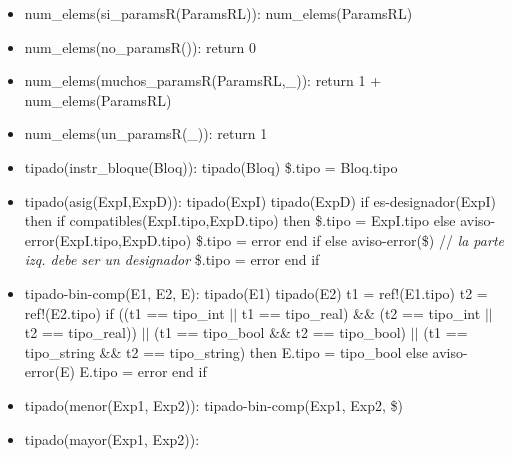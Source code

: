\documentclass[11pt]{article}
\begin{document}
\begin{itemize}
            \item num\_elems(si\_paramsR(ParamsRL)): 
                \subitem num\_elems(ParamsRL) 
            \item num\_elems(no\_paramsR()): 
                \subitem return 0
            \item num\_elems(muchos\_paramsR(ParamsRL,\_)): 
                \subitem return 1 + num\_elems(ParamsRL)
            \item num\_elems(un\_paramsR(\_)): 
                \subitem return 1
            \item tipado(instr\_bloque(Bloq)): 
                \subitem tipado(Bloq)
                \subitem \$.tipo = Bloq.tipo
            \item tipado(asig(ExpI,ExpD)): 
                \subitem tipado(ExpI) 
                \subitem tipado(ExpD) 
                \subitem if es-designador(ExpI) then
                    \subsubitem if compatibles(ExpI.tipo,ExpD.tipo) then 
                        \subsubitem \hspace{2em}
                        \$.tipo = ExpI.tipo
                    \subsubitem else 
                        \subsubitem \hspace{2em} aviso-error(ExpI.tipo,ExpD.tipo) 
                        \subsubitem \hspace{2em} \$.tipo = error 
                    \subsubitem end if 
                \subitem else 
                    \subsubitem aviso-error(\$) \/// \textit{la parte izq. debe ser un designador}
                    \subsubitem \$.tipo = error 
                \subitem end if
            \item tipado-bin-comp(E1, E2, E): 
                \subitem tipado(E1) 
                \subitem tipado(E2) 
                \subitem t1 = ref!(E1.tipo) 
                \subitem t2 = ref!(E2.tipo) 
                \subitem if ((t1 == tipo\_int $\vert \vert$ t1 == tipo\_real) \&\&  (t2 == tipo\_int $\vert \vert$ t2 == tipo\_real)) $\vert \vert$ 
                    (t1 == tipo\_bool \&\&  t2 == tipo\_bool) $\vert \vert$ 
                    (t1 == tipo\_string \&\&  t2 == tipo\_string) then
                    \subsubitem E.tipo = tipo\_bool
                \subitem else 
                    \subsubitem aviso-error(E)
                    \subsubitem E.tipo = error
                \subitem end if
            \item tipado(menor(Exp1, Exp2)):
                \subitem tipado-bin-comp(Exp1, Exp2, \$)
            \item tipado(mayor(Exp1, Exp2)): 

\end{itemize}
\end{document}

